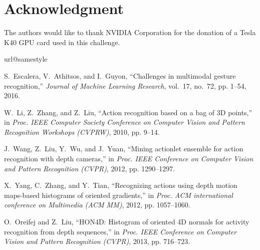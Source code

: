 \documentclass[10pt, a4paper, conference]{IEEEtran}
\begin{document}
\section*{Acknowledgment}
The authors would like to thank NVIDIA Corporation for the donation of a Tesla K40 GPU card used in this challenge.




\begin{thebibliography}{10}
\providecommand{\url}[1]{#1}
\csname url@samestyle\endcsname
\providecommand{\newblock}{\relax}
\providecommand{\bibinfo}[2]{#2}
\providecommand{\BIBentrySTDinterwordspacing}{\spaceskip=0pt\relax}
\providecommand{\BIBentryALTinterwordstretchfactor}{4}
\providecommand{\BIBentryALTinterwordspacing}{\spaceskip=\fontdimen2\font plus
\BIBentryALTinterwordstretchfactor\fontdimen3\font minus
  \fontdimen4\font\relax}
\providecommand{\BIBforeignlanguage}[2]{{%
\expandafter\ifx\csname l@#1\endcsname\relax
\typeout{** WARNING: IEEEtran.bst: No hyphenation pattern has been}%
\typeout{** loaded for the language `#1'. Using the pattern for}%
\typeout{** the default language instead.}%
\else
\language=\csname l@#1\endcsname
\fi
#2}}
\providecommand{\BIBdecl}{\relax}
\BIBdecl

S.~Escalera, V.~Athitsos, and I.~Guyon, ``Challenges in multimodal gesture
  recognition,'' \emph{Journal of Machine Learning Research}, vol.~17, no.~72,
  pp. 1--54, 2016.

W.~Li, Z.~Zhang, and Z.~Liu, ``Action recognition based on a bag of {3D}
  points,'' in \emph{Proc. IEEE Computer Society Conference on Computer Vision
  and Pattern Recognition Workshops (CVPRW)}, 2010, pp. 9--14.

J.~Wang, Z.~Liu, Y.~Wu, and J.~Yuan, ``Mining actionlet ensemble for action
  recognition with depth cameras,'' in \emph{Proc. IEEE Conference on Computer
  Vision and Pattern Recognition (CVPR)}, 2012, pp. 1290--1297.

X.~Yang, C.~Zhang, and Y.~Tian, ``Recognizing actions using depth motion
  maps-based histograms of oriented gradients,'' in \emph{Proc. ACM
  international conference on Multimedia (ACM MM)}, 2012, pp. 1057--1060.

O.~Oreifej and Z.~Liu, ``{HON4D}: Histogram of oriented {4D} normals for
  activity recognition from depth sequences,'' in \emph{Proc. IEEE Conference
  on Computer Vision and Pattern Recognition (CVPR)}, 2013, pp. 716--723.


\end{thebibliography}
\end{document}
